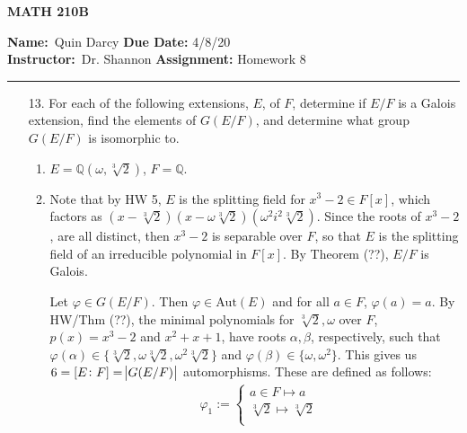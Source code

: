 \documentclass[12pt]{article}
\makeatletter
\theoremstyle{definition}
\theoremstyle{remark}
\newenvironment{solution}[1][\bf{\textit{Solution}}]{\par
  
  \normalfont \topsep6\p@\@plus6\p@\relax
  \list{}{\leftmargin=0mm
          \rightmargin=4mm
          \settowidth{\itemindent}{\itshape#1}%
          \labelwidth=\itemindent
          \parsep=0pt \listparindent=\parindent 
  }
  \item[\hskip\labelsep
        \itshape
    #1\@addpunct{.}]\ignorespaces
}{%
  \popQED\endlist\@endpefalse
}
\makeatother
\begin{document}
\thispagestyle{empty}\hline

\begin{center}
	\vspace{.4cm} {\textbf { \large MATH 210B}}
\end{center}
{\textbf{Name:}\ Quin Darcy \hspace{\fill} \textbf{Due Date:} 4/8/20   \\
{ \textbf{Instructor:}}\ Dr. Shannon \hspace{\fill} \textbf{Assignment:} Homework 8 \\ \hrule}

\justifying

    \begin{enumerate}[leftmargin=*]
        \item[13.] For each of the following extensions, $E$, of $F$, determine if $E/F$ is a Galois extension, find the elements of $G(E/F)$, and determine what group $G(E/F)$ is isomorphic to.
            \begin{enumerate}
                \item $E=\mathbb{Q}(\omega,\sqrt[3]{2})$, $F=\mathbb{Q}$.
                    \begin{solution}
                        Note that by HW 5, $E$ is the splitting field for $x^3-2\in F[x]$, which factors as $(x-\sqrt[3]{2})(x-\omega\sqrt[3]{2})(\omega^2i^2\sqrt[3]{2})$. Since the roots of $x^3-2$, are all distinct, then $x^3-2$ is separable over $F$, so that $E$ is the splitting field of an irreducible polynomial in $F[x]$. By Theorem (??), $E/F$ is Galois.\par\hspace{4mm} Let $\varphi\in G(E/F)$. Then $\varphi\in\text{Aut}(E)$ and for all $a\in F$, $\varphi(a)=a$. By HW/Thm (??), the minimal polynomials for $\sqrt[3]{2},\omega$ over $F$, $p(x)=x^3-2$ and $x^2+x+1$, have roots $\alpha,\beta$, respectively, such that $\varphi(\alpha)\in\{\sqrt[3]{2}, \omega\sqrt[3]{2},\omega^2\sqrt[3]{2}\}$ and $\varphi(\beta)\in\{\omega, \omega^2\}$. This gives us $6=[E\colon F]=\abs{G(E/F)}$ automorphisms. These are defined as follows:
                            \begin{align*}
                                &\varphi_1:=
                                    \begin{cases}
                                        a\in F\mapsto a \\
                                        \sqrt[3]{2}\mapsto\sqrt[3]{2}\\

\end{cases}
\end{align*}
\end{solution}
\end{enumerate}
\end{enumerate}
\end{document}
